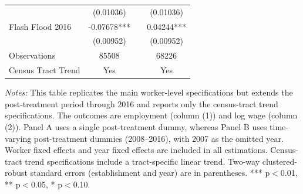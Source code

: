 \begin{supptable}[H]
{\begin{threeparttable}
\begin{tabular}{lccc}
                     & (0.01036) &       & (0.01036)\\
    Flash Flood 2016 & -0.07678*** &       & 0.04244***\\
                     & (0.00952) &       & (0.00952)\\
    \midrule
    Observations & 85508 &       & 68226\\
    Census Tract Trend & Yes &       & Yes\\
    \bottomrule
    \end{tabular}%
    \begin{tablenotes}[flushleft]
    \item \small \textit{Notes:} This table replicates the main worker-level specifications but extends the post-treatment period through 2016 and reports only the census-tract trend specifications. The outcomes are employment (column (1)) and log wage (column (2)). Panel A uses a single post-treatment dummy, whereas Panel B uses time-varying post-treatment dummies (2008–2016), with 2007 as the omitted year. Worker fixed effects and year fixed effects are included in all estimations. Census-tract trend specifications include a tract-specific linear trend. Two-way clustered-robust standard errors (establishment and year) are in parentheses. *** p$<$0.01, ** p$<$0.05, * p$<$0.10.
    \end{tablenotes}
 \end{threeparttable}
 }
\end{supptable}%
